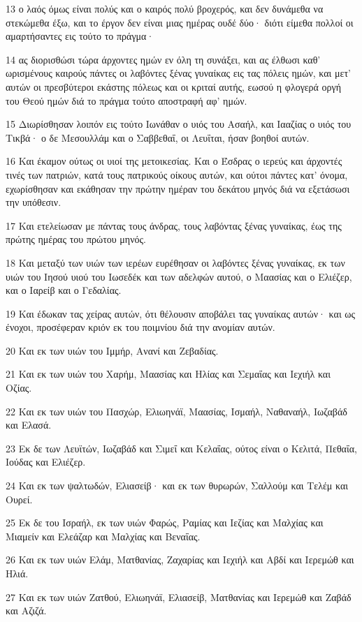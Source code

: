 \par 13 ο λαός όμως είναι πολύς και ο καιρός πολύ βροχερός, και δεν δυνάμεθα να στεκώμεθα έξω, και το έργον δεν είναι μιας ημέρας ουδέ δύο· διότι είμεθα πολλοί οι αμαρτήσαντες εις τούτο το πράγμα·
\par 14 ας διορισθώσι τώρα άρχοντες ημών εν όλη τη συνάξει, και ας έλθωσι καθ' ωρισμένους καιρούς πάντες οι λαβόντες ξένας γυναίκας εις τας πόλεις ημών, και μετ' αυτών οι πρεσβύτεροι εκάστης πόλεως και οι κριταί αυτής, εωσού η φλογερά οργή του Θεού ημών διά το πράγμα τούτο αποστραφή αφ' ημών.
\par 15 Διωρίσθησαν λοιπόν εις τούτο Ιωνάθαν ο υιός του Ασαήλ, και Ιααζίας ο υιός του Τικβά· ο δε Μεσουλλάμ και ο Σαββεθαΐ, οι Λευΐται, ήσαν βοηθοί αυτών.
\par 16 Και έκαμον ούτως οι υιοί της μετοικεσίας. Και ο Έσδρας ο ιερεύς και άρχοντές τινές των πατριών, κατά τους πατρικούς οίκους αυτών, και ούτοι πάντες κατ' όνομα, εχωρίσθησαν και εκάθησαν την πρώτην ημέραν του δεκάτου μηνός διά να εξετάσωσι την υπόθεσιν.
\par 17 Και ετελείωσαν με πάντας τους άνδρας, τους λαβόντας ξένας γυναίκας, έως της πρώτης ημέρας του πρώτου μηνός.
\par 18 Και μεταξύ των υιών των ιερέων ευρέθησαν οι λαβόντες ξένας γυναίκας, εκ των υιών του Ιησού υιού του Ιωσεδέκ και των αδελφών αυτού, ο Μαασίας και ο Ελιέζερ, και ο Ιαρείβ και ο Γεδαλίας.
\par 19 Και έδωκαν τας χείρας αυτών, ότι θέλουσιν αποβάλει τας γυναίκας αυτών· και ως ένοχοι, προσέφεραν κριόν εκ του ποιμνίου διά την ανομίαν αυτών.
\par 20 Και εκ των υιών του Ιμμήρ, Ανανί και Ζεβαδίας.
\par 21 Και εκ των υιών του Χαρήμ, Μαασίας και Ηλίας και Σεμαΐας και Ιεχιήλ και Οζίας.
\par 22 Και εκ των υιών του Πασχώρ, Ελιωηνάϊ, Μαασίας, Ισμαήλ, Ναθαναήλ, Ιωζαβάδ και Ελασά.
\par 23 Εκ δε των Λευϊτών, Ιωζαβάδ και Σιμεΐ και Κελαΐας, ούτος είναι ο Κελιτά, Πεθαΐα, Ιούδας και Ελιέζερ.
\par 24 Και εκ των ψαλτωδών, Ελιασείβ· και εκ των θυρωρών, Σαλλούμ και Τελέμ και Ουρεί.
\par 25 Εκ δε του Ισραήλ, εκ των υιών Φαρώς, Ραμίας και Ιεζίας και Μαλχίας και Μιαμείν και Ελεάζαρ και Μαλχίας και Βεναΐας.
\par 26 Και εκ των υιών Ελάμ, Ματθανίας, Ζαχαρίας και Ιεχιήλ και Αβδί και Ιερεμώθ και Ηλιά.
\par 27 Και εκ των υιών Ζατθού, Ελιωηνάϊ, Ελιασείβ, Ματθανίας και Ιερεμώθ και Ζαβάδ και Αζιζά.
